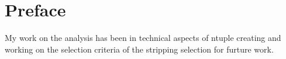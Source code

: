 \chapter{Preface}


My work on the \bmumu \BF analysis has been in technical aspects of ntuple creating and working on the selection criteria of the stripping selection for furture work.
